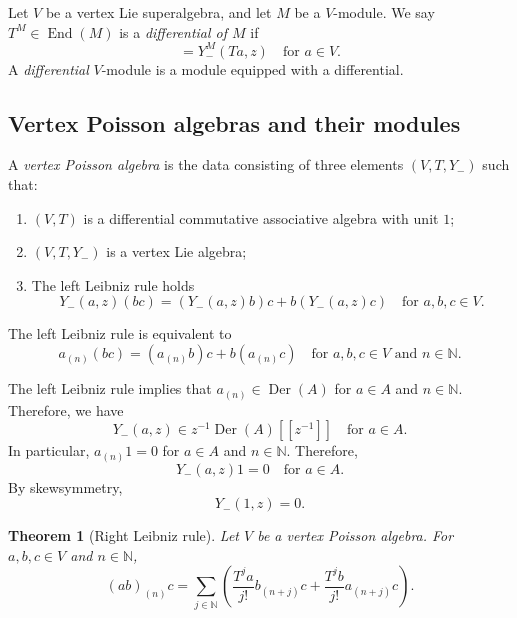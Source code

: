 \documentclass[a4paper, 12pt, reqno]{amsart}
\newtheorem{theorem}{Theorem}[section]
\theoremstyle{remark}
\DeclareMathOperator{\End}{End}
\DeclareMathOperator{\Der}{Der}
\begin{document}
Let $V$ be a vertex Lie superalgebra, and let $M$ be a $V$-module.
We say $T^M \in \End(M)$ is a \emph{differential of $M$} if
\begin{equation*}
  [T^M, Y^M_-(a, z)] = Y^M_-(Ta, z) \quad \text{for $a \in V$}.
\end{equation*}
A \emph{differential} $V$-module is a module equipped with a differential.

\subsection{Vertex Poisson algebras and their modules}
\label{sec:vert-poiss-algeb-1}

A \emph{vertex Poisson algebra} is the data consisting of three elements $(V, T, Y_-)$ such that:
\begin{enumerate}
\item $(V, T)$ is a differential commutative associative algebra with unit $1$;
\item $(V, T, Y_-)$ is a vertex Lie algebra;
\item The left Leibniz rule holds
  \begin{equation*}
    Y_-(a, z)(bc) = (Y_-(a, z)b)c + b(Y_-(a, z)c) \quad \text{for $a, b, c \in V$}.
  \end{equation*}
\end{enumerate}

The left Leibniz rule is equivalent to
\begin{equation*}
  a_{(n)}(bc) = (a_{(n)}b)c + b(a_{(n)}c) \quad \text{for $a, b, c \in V$ and $n \in \mathbb{N}$}.
\end{equation*}

The left Leibniz rule implies that $a_{(n)} \in \Der(A)$ for $a \in A$ and $n \in \mathbb{N}$.
Therefore, we have
\begin{equation*}
  Y_-(a, z) \in z^{-1}\Der(A)[[z^{-1}]] \quad \text{for $a \in A$}.
\end{equation*}
In particular, $a_{(n)}1 = 0$ for $a \in A$ and $n \in \mathbb{N}$.
Therefore,
\begin{equation*}
  Y_-(a, z)1 = 0 \quad \text{for $a \in A$}.
\end{equation*}
By skewsymmetry,
\begin{equation*}
  Y_-(1, z) = 0.
\end{equation*}

\begin{theorem}[Right Leibniz rule]
  \label{thr:50}
  Let $V$ be a vertex Poisson algebra.
  For $a, b, c \in V$ and $n \in \mathbb{N}$,
  \begin{equation*}
    (ab)_{(n)}c = \sum_{j \in \mathbb{N}}\left(\frac{T^ja}{j!}b_{(n + j)}c + \frac{T^jb}{j!}a_{(n + j)}c\right).
  \end{equation*}
\end{theorem}
\end{document}
